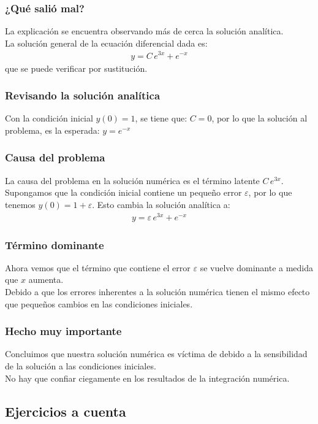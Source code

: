 \documentclass[12pt]{beamer}
\begin{document}
\begin{frame}
\frametitle{¿Qué salió mal?}
La explicación se encuentra observando más de cerca la solución analítica.
\\
\bigskip
\pause
La solución general de la ecuación diferencial dada es:
\pause
\begin{align*}
y = C \, e^{3 x} + e^{-x}
\end{align*}
que se puede verificar por sustitución.
\end{frame}
\begin{frame}
\frametitle{Revisando la solución analítica}
Con la condición inicial $y (0) = 1$, \pause se tiene que: $C = 0$, \pause por lo que la solución al problema, es la esperada: $y = e^{-x}$
\end{frame}
\begin{frame}
\frametitle{Causa del problema}
La causa del problema en la solución numérica es el término latente $C \, e^{3 x}$.
\\
\bigskip
\pause
Supongamos que la condición inicial contiene un pequeño error $\varepsilon$, por lo que tenemos $y (0) = 1 + \varepsilon$. \pause Esto cambia la solución analítica a:
\pause
\begin{align*}
y = \varepsilon \, e^{3 x} + e^{-x}
\end{align*}
\end{frame}
\begin{frame}
\frametitle{Término dominante}
Ahora vemos que el término que contiene el error $\varepsilon$ se vuelve dominante a medida que $x$ aumenta.
\\
\bigskip
\pause
Debido a que los errores inherentes a la solución numérica tienen el mismo efecto que pequeños cambios en las condiciones iniciales.
\end{frame}
\begin{frame}
\frametitle{Hecho muy importante}
Concluimos que nuestra solución numérica es víctima de  debido a la sensibilidad de la solución a las condiciones iniciales.
\\
\bigskip
\pause
\textbf{} No hay que confiar ciegamente en los resultados de la integración numérica.
\end{frame}

\subsection{Ejercicios a cuenta}
\end{document}
